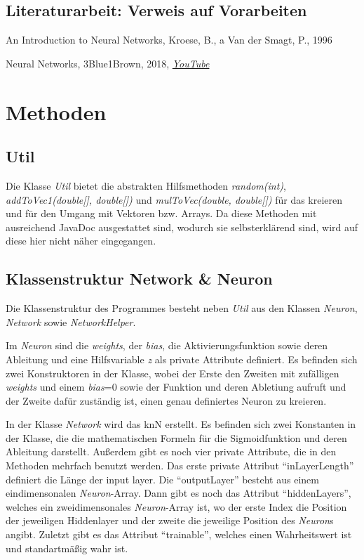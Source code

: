 \documentclass[paper=A4,pagesize=auto,12pt,headinclude=true,footinclude=true,BCOR=0mm,DIV=calc]{scrartcl}
\begin{document}
\subsection{Literaturarbeit: Verweis auf Vorarbeiten}
\begin{itemize}
	\item{An Introduction to Neural Networks, Kroese, B., a Van der Smagt, P., 1996}
	\hypertarget{3b1b}{\item{Neural Networks, 3Blue1Brown, 2018, \hyperref{https://www.youtube.com/playlist?list=PLZHQObOWTQDNU6R1_67000Dx_ZCJB-3pi}{}{}{\textit{YouTube}}}}
\end{itemize}


\newpage


\section{Methoden}

\subsection{Util}
Die Klasse \textit{Util} bietet die abstrakten Hilfsmethoden \textit{random(int)}, \textit{addToVec1(double[], double[])} und \textit{mulToVec(double, double[])} für das kreieren und für den Umgang mit Vektoren bzw. Arrays. Da diese Methoden mit ausreichend JavaDoc ausgestattet sind, wodurch sie selbsterklärend sind, wird auf diese hier nicht näher eingegangen.


\subsection{Klassenstruktur Network \& Neuron} %
Die Klassenstruktur des Programmes besteht neben \textit{Util} aus den Klassen \textit{Neuron}, \textit{Network} sowie \textit{NetworkHelper}.

Im \textit{Neuron} sind die \textit{weights}, der \textit{bias}, die Aktivierungsfunktion sowie deren Ableitung und eine Hilfsvariable \textit{z} als private Attribute definiert.
Es befinden sich zwei Konstruktoren in der Klasse, wobei der Erste den Zweiten mit zufälligen \textit{weights} und einem \textit{bias}=0 sowie der Funktion und deren Abletiung aufruft und der Zweite dafür zuständig ist, einen genau definiertes Neuron zu kreieren.

In der Klasse \textit{Network} wird das knN erstellt.
Es befinden sich zwei Konstanten in der Klasse, die die mathematischen Formeln für die Sigmoidfunktion und deren Ableitung darstellt. Außerdem gibt es noch vier private Attribute,  die in den Methoden mehrfach benutzt werden. Das erste private Attribut “inLayerLength” definiert die Länge der input layer. Die “outputLayer” besteht aus einem eindimensonalen \textit{Neuron}-Array. Dann gibt es noch das Attribut “hiddenLayers”, welches ein zweidimensonales \textit{Neuron}-Array ist, wo der erste Index die Position der jeweiligen Hiddenlayer und der zweite die jeweilige Position des \textit{Neuron}s angibt. Zuletzt gibt es das Attribut “trainable”, welches einen Wahrheitswert ist und standartmäßig wahr ist.
\end{document}
